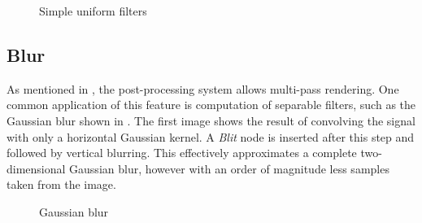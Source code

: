 \begin{figure}[ht!]
  \centering
  \caption{Simple uniform filters}
  \label{fig:postProcSimple}
\end{figure}

\subsection{Blur}

As mentioned in , the post-processing system allows multi-pass rendering. One common application of this feature is computation of separable filters, such as the Gaussian blur shown in . The first image shows the result of convolving the signal with only a horizontal Gaussian kernel. A \emph{Blit} node is inserted after this step and followed by vertical blurring. This effectively approximates a complete two-dimensional Gaussian blur, however with an order of magnitude less samples taken from the image.

\begin{figure}[ht!]
  \centering
  \caption{Gaussian blur}
  \label{fig:postProcBlur}
\end{figure}

